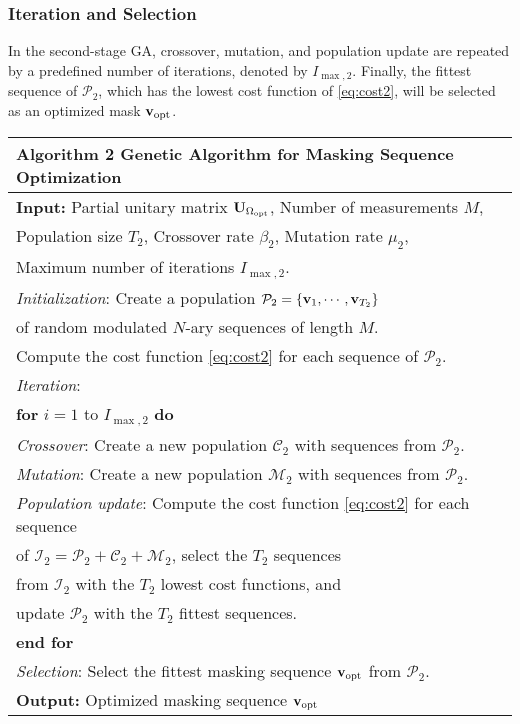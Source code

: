 \documentclass[journal]{IEEEtran}
\newcommand{\mC}{\mathcal{C}}
\newcommand{\mI}{\mathcal{I}}
\newcommand{\mM}{\mathcal{M}}
\newcommand{\mP}{\mathcal{P}}
\newcommand{\vbu}{{\bf v}}
\newcommand{\Ubu}{{\bf U}}
\numberwithin{const2}{const}
\begin{document}
\subsubsection{Iteration and Selection}
In the second-stage GA, %
crossover, mutation, and population update
are repeated by a predefined number of iterations, denoted by $I_{\max, 2}$.
Finally, the fittest sequence of $\mP_2$, which has the lowest cost function of \eqref{eq:cost2},
will be selected as an optimized mask $\vbu_{\rm opt}$. 



\begin{table}[!t]
	\fontsize{8}{10pt}\selectfont
	\centering
	\begin{tabular}{l}
		\hlineB{2.5}
		\textbf{Algorithm 2} Genetic Algorithm for Masking Sequence Optimization \\
		\hline
		\textbf{Input:} Partial unitary matrix $\Ubu_{\Omega_{\rm opt}}$, Number of measurements $M$, \\ 
		\qquad \quad Population size $T_2$, Crossover rate $\beta_2$, Mutation rate $\mu_{2}$,  \\
		\qquad \quad Maximum number of iterations $I_{\max, 2}$. \\
		\emph{Initialization}: Create a population $\mP_2 = \{ \vbu_1, \cdots, \vbu_{T_2}\}$    \\
		\qquad \qquad \qquad of random modulated $N$-ary sequences of length $M$.  \\		
		\qquad \qquad \qquad Compute the cost function \eqref{eq:cost2} 
		for each sequence of $\mP_2$. \\ 
		\emph{Iteration}:  \\
		\textbf{for} $i=1$ to $I_{\max, 2}$ \textbf{do}  \\
		\quad \emph{Crossover}: Create a new population $\mC_2$ with sequences from $\mP_2$. \\
		\quad \emph{Mutation}: Create a new population $\mM_2$ with sequences from $\mP_2$. \\
		\quad \emph{Population update}: Compute the cost function \eqref{eq:cost2} for each sequence \\ %
		\qquad \qquad \qquad \qquad \quad of $\mI_2 = \mP_2 + \mC_2+\mM_2$, select the $T_2$ sequences \\
		\qquad \qquad \qquad \qquad \quad from $\mI_2$ with the $T_2$ lowest cost functions, and \\
		\qquad \qquad \qquad \qquad \quad update $\mP_2$ with the $T_2$ fittest sequences. \\
		\textbf{end for} \\
		\emph{Selection}: Select the fittest masking sequence $\vbu_{\rm opt}$ from $\mP_2$. \\ 
		\textbf{Output:} Optimized masking sequence $\vbu_{\rm opt}$ \\
		\hline
	\end{tabular}
	\label{tb:ga2}
\end{table}
\end{document}
